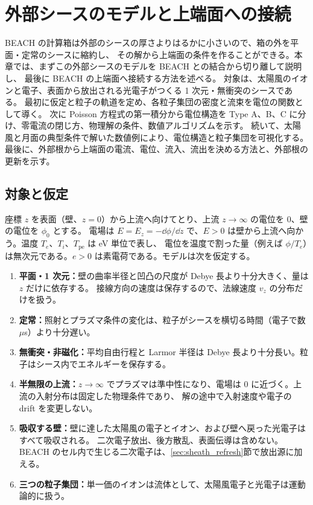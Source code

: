 \chapter{外部シースのモデルと上端面への接続}
\label{ch:sheath_model}

BEACH の計算箱は外部のシースの厚さよりはるかに小さいので、箱の外を平面・定常のシースに縮約し、
その解から上端面の条件を作ることができる。本章では、まずこの外部シースのモデルを BEACH との結合から切り離して説明し、
最後に BEACH の上端面へ接続する方法を述べる。
対象は、太陽風のイオンと電子、表面から放出される光電子がつくる 1 次元・無衝突のシースである。
最初に仮定と粒子の軌道を定め、各粒子集団の密度と流束を電位の関数として導く。
次に Poisson 方程式の第一積分から電位構造を Type A、B、C に分け、零電流の閉じ方、物理解の条件、数値アルゴリズムを示す。
続いて、太陽風と月面の典型条件で解いた数値例により、電位構造と粒子集団を可視化する。
最後に、外部根から上端面の電流、電位、流入、流出を決める方法と、外部根の更新を示す。

\section{対象と仮定}
\label{sec:sm_assumptions}
座標 $z$ を表面（壁、$z=0$）から上流へ向けてとり、上流 $z\to\infty$ の電位を 0、壁の電位を $\phi_0$ とする。
電場は $E=E_z=-\dd\phi/\dd z$ で、$E>0$ は壁から上流へ向かう。温度 $T_e$、$T_i$、$T_{\mathrm{pe}}$ は eV 単位で表し、
電位を温度で割った量（例えば $\phi/T_e$）は無次元である。$e>0$ は素電荷である。モデルは次を仮定する。

\begin{enumerate}
\item \textbf{平面・1 次元：}壁の曲率半径と凹凸の尺度が Debye 長より十分大きく、量は $z$ だけに依存する。
  接線方向の速度は保存するので、法線速度 $v_z$ の分布だけを扱う。
\item \textbf{定常：}照射とプラズマ条件の変化は、粒子がシースを横切る時間（電子で数 $\mu$s）より十分遅い。
\item \textbf{無衝突・非磁化：}平均自由行程と Larmor 半径は Debye 長より十分長い。粒子はシース内でエネルギーを保存する。
\item \textbf{半無限の上流：}$z\to\infty$ でプラズマは準中性になり、電場は 0 に近づく。上流の入射分布は固定した物理条件であり、
  解の途中で入射速度や電子の drift を変更しない。
\item \textbf{吸収する壁：}壁に達した太陽風の電子とイオン、および壁へ戻った光電子はすべて吸収される。
  二次電子放出、後方散乱、表面伝導は含めない。BEACH のセル内で生じる二次電子は、\ref{sec:sheath_refresh}節で放出源に加える。
\item \textbf{三つの粒子集団：}単一価のイオンは流体として、太陽風電子と光電子は運動論的に扱う。
\end{enumerate}

